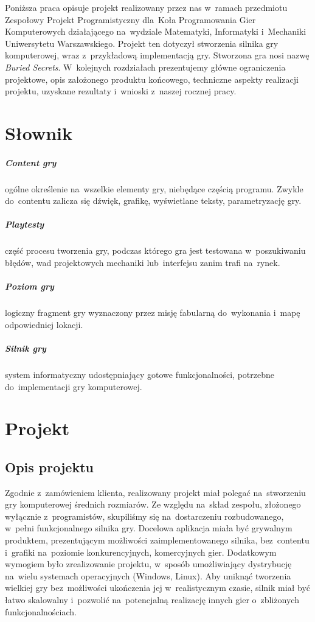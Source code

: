 \documentclass[licencjacka]{pracamgr}
\begin{document}
  Poniższa praca opisuje projekt realizowany przez nas w~ramach przedmiotu Zespołowy Projekt Programistyczny dla~Koła Programowania
  Gier Komputerowych działającego na~wydziale Matematyki, Informatyki i~Mechaniki Uniwersytetu Warszawskiego.
  Projekt ten dotyczył stworzenia silnika gry komputerowej, wraz z~przykładową implementacją gry. Stworzona gra nosi nazwę
  \emph{Buried Secrets}. W~kolejnych rozdziałach prezentujemy główne ograniczenia projektowe, opis założonego produktu końcowego,
  techniczne aspekty realizacji projektu, uzyskane rezultaty i~wnioski z~naszej rocznej pracy.


\chapter{Słownik}
  \paragraph{Content gry} ogólne określenie na~wszelkie elementy gry, niebędące częścią programu. Zwykle do~contentu zalicza się
    dźwięk, grafikę, wyświetlane teksty, parametryzację gry.
  \paragraph{Playtesty} część procesu tworzenia gry, podczas którego gra jest testowana w~poszukiwaniu błędów, wad projektowych mechaniki
    lub~interfejsu zanim trafi na~rynek.
  \paragraph{Poziom gry} logiczny fragment gry wyznaczony przez misję fabularną do~wykonania i~mapę odpowiedniej lokacji.
  \paragraph{Silnik gry} system informatyczny udostępniający gotowe funkcjonalności, potrzebne do~implementacji gry komputerowej.

\chapter{Projekt}

  \section{Opis projektu}
    Zgodnie z~zamówieniem klienta, realizowany projekt miał polegać na~stworzeniu gry komputerowej
    średnich rozmiarów. Ze względu na~skład zespołu, złożonego wyłącznie z~programistów, skupiliśmy się
    na~dostarczeniu rozbudowanego, w~pełni funkcjonalnego silnika gry.
    Docelowa aplikacja miała być grywalnym produktem, prezentującym możliwości zaimplementowanego silnika,
    bez~contentu i~grafiki na~poziomie konkurencyjnych, komercyjnych gier. Dodatkowym wymogiem było zrealizowanie
    projektu, w~sposób umożliwiający dystrybucję na~wielu systemach operacyjnych (Windows, Linux). Aby uniknąć
    tworzenia wielkiej gry bez~możliwości ukończenia jej w~realistycznym czasie, silnik miał być łatwo skalowalny
    i~pozwolić na~potencjalną realizację innych gier o~zbliżonych funkcjonalnościach.
\end{document}
